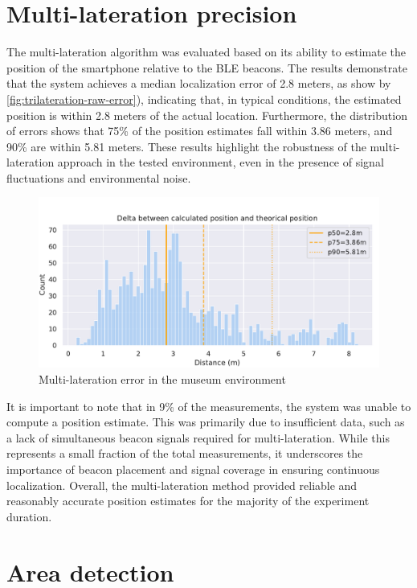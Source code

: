 \section{Multi-lateration precision}

The multi-lateration algorithm was evaluated based on its ability to estimate the position of the smartphone relative to the BLE beacons. The results demonstrate that the system achieves a median localization error of 2.8 meters, as show by \autoref{fig:trilateration-raw-error}), indicating that, in typical conditions, the estimated position is within 2.8 meters of the actual location. Furthermore, the distribution of errors shows that 75\% of the position estimates fall within 3.86 meters, and 90\% are within 5.81 meters. These results highlight the robustness of the multi-lateration approach in the tested environment, even in the presence of signal fluctuations and environmental noise.

\begin{figure}[H]
		\centering
		\includegraphics[width=\linewidth]{assets/museum-location-precision.pdf}
		\caption{Multi-lateration error in the museum environment}
		\label{fig:trilateration-raw-error}
\end{figure}


It is important to note that in 9\% of the measurements, the system was unable to compute a position estimate. This was primarily due to insufficient data, such as a lack of simultaneous beacon signals required for multi-lateration. While this represents a small fraction of the total measurements, it underscores the importance of beacon placement and signal coverage in ensuring continuous localization. Overall, the multi-lateration method provided reliable and reasonably accurate position estimates for the majority of the experiment duration.


\section{Area detection}

